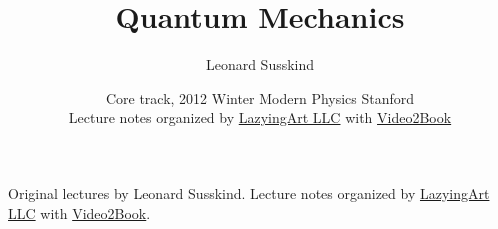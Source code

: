 \documentclass[11pt,oneside]{book}
\begin{document}
\frontmatter

\title{Quantum Mechanics}
\author{Leonard Susskind}
\date{Core track, 2012 Winter Modern Physics Stanford \\ Lecture notes organized by \href{https://lazying.art}{LazyingArt LLC} with \href{https://github.com/lachlanchen/Video2Book}{Video2Book}}
\maketitle
\begin{center}
\small Original lectures by Leonard Susskind. Lecture notes organized by \href{https://lazying.art}{LazyingArt LLC} with \href{https://github.com/lachlanchen/Video2Book}{Video2Book}.
\end{center}
\clearpage
\tableofcontents
\mainmatter










\end{document}
